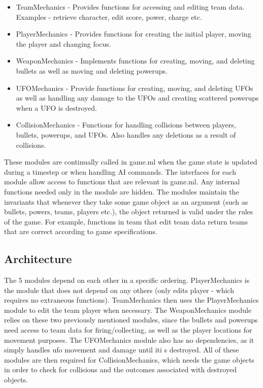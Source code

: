 \documentclass{article}
\begin{document}
\begin{itemize}
\item TeamMechanics - Provides functions for accessing and editing team data. Examples - retrieve character, edit score, power, charge etc.
\item PlayerMechanics - Provides functions for creating the initial player, moving the player and changing focus.
\item WeaponMechanics - Implements functions for creating, moving, and deleting bullets as well as moving and deleting powerups.
\item UFOMechanics - Provide functions for creating, moving, and deleting UFOs as well as handling any damage to the UFOs and creating scattered powerups when a UFO is destroyed.
\item CollisionMechanics - Functions for handling collisions between players, bullets, powerups, and UFOs.  Also handles any deletions as a result of collisions.
\end{itemize}

These modules are continually called in game.ml when the game state is updated during a timestep or when handling AI commands. The interfaces for each module
allow access to  functions that are relevant in game.ml. Any internal functions needed only in the module are hidden. The modules maintain the invariants that whenever they take some game object as an argument (such as bullets, powers, teams, players etc.), the object returned is valid under the rules of the game. For example, functions in team that edit team data return teams that are correct according to game specifications.

\subsection{Architecture}
The 5 modules depend on each other in a specific ordering. PlayerMechanics is the module that does not depend on any others (only edits player - which requires no extraneous functions). TeamMechanics then uses the PlayerMechanics module to edit the team player when necessary. The WeaponMechanics module relies on these two previously mentioned modules, since the bullets and powerups need access to team data for firing/collecting, as well as the player locations for movement purposes. The UFOMechanics module also has no dependencies, as it simply handles ufo movement and damage until iti s destroyed. All of these modules are then required for CollisionMechanics, which needs the game objects in order to check for collisions and the outcomes associated with destroyed objects.
\end{document}
